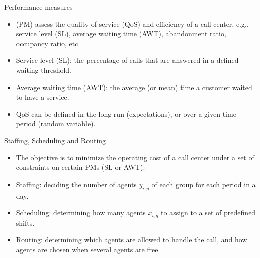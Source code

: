 \documentclass[aspectratio=169]{beamer}
\begin{document}
\begin{frame}{Performance measures}
	\begin{itemize}
		\item{} {\color{blue}{Performance measures} (PM)} assess the quality of service (QoS) and
		efficiency of a call center, e.g., service level (SL), average waiting time (AWT), abandonment ratio, occupancy ratio, etc.
		\item {\color{blue}Service level (SL)}: the percentage of calls that are answered in a defined waiting threshold.
		\item {\color{blue}Average waiting time (AWT)}: the average (or mean) time a customer waited to have a service.
		\item{} QoS can be defined in the long run (expectations), or over a given time period (random variable).
	\end{itemize}
\end{frame}

\begin{frame}{Staffing, Scheduling and Routing}
	\begin{itemize}
		\item{} The objective is to minimize the operating cost of a call center under a set of constraints on certain PMs (SL or AWT).
		\item{} Staffing: deciding the number of agents $y_{i,p}$ of each group for each period in a day.
		\item{} Scheduling:  determining how many agents $x_{i,q}$ to assign to a set of predefined shifts.
		\item{} Routing: determining which agents are allowed to handle the call, and how agents are chosen when several agents are free.
		
	\end{itemize}
\end{frame}
\end{document}

